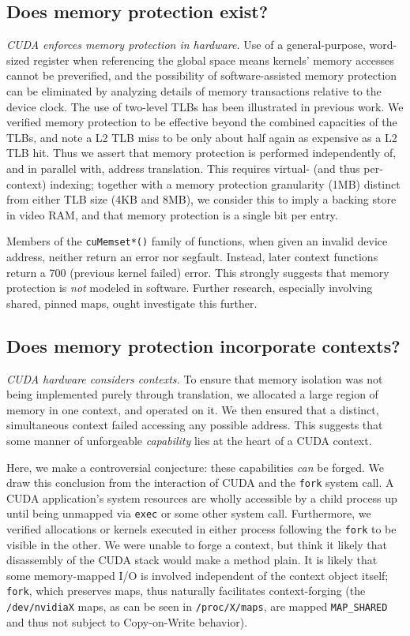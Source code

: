 \documentclass[letterpaper,10pt]{article}
\begin{document}
\begin{multicols}{2}
\subsection{Does memory protection exist?}
\textit{CUDA enforces memory protection in hardware.} Use of a general-purpose,
word-sized register when referencing the global space means kernels' memory
accesses cannot be preverified, and the possibility of software-assisted memory
protection can be eliminated by analyzing details of memory transactions
relative to the device clock\cite{microbenchmarks}. The use of two-level TLBs
has been illustrated in previous work\cite{demmel}. We verified memory
protection to be effective beyond the combined capacities of the TLBs, and
note a L2 TLB miss to be only about half again as expensive as a L2 TLB hit.
Thus we assert that memory protection is performed independently of, and in
parallel with, address translation. This requires virtual- (and thus per-context)
indexing; together with a memory protection granularity (1MB) distinct from
either TLB size (4KB and 8MB), we consider this to imply a backing store in
video RAM, and that memory protection is a single bit per entry.

Members of the \texttt{cuMemset*()} family of functions, when given an invalid device address,
neither return an error nor segfault. Instead, later context functions return
a 700 (previous kernel failed) error. This strongly suggests that memory
protection is \textit{not} modeled in software. Further research, especially
involving shared, pinned maps, ought investigate this further.
\subsection{Does memory protection incorporate contexts?}
\textit{CUDA hardware considers contexts.} To ensure that memory isolation
was not being implemented purely through translation, we allocated a large
region of memory in one context, and operated on it. We then ensured that a
distinct, simultaneous context failed accessing any possible address. This
suggests that some manner of unforgeable \textit{capability}\cite{capability}
lies at the heart of a CUDA context.

Here, we make a controversial conjecture: these capabilities \textit{can}
be forged. We draw this conclusion from the interaction of CUDA and the \texttt{fork}
system call. A CUDA application's system resources are wholly accessible by a
child process up until being unmapped via \texttt{exec} or some other system call.
Furthermore, we verified allocations or kernels executed in either process following the
\texttt{fork} to be visible in the other. We were unable to forge a context,
but think it likely that disassembly of the CUDA stack would make a method plain.
It is likely that some memory-mapped I/O is involved independent of the context
object itself; \texttt{fork}, which preserves maps, thus naturally facilitates
context-forging (the \texttt{/dev/nvidiaX} maps, as can be seen in \texttt{/proc/X/maps},
are mapped \texttt{MAP\_SHARED} and thus not subject to Copy-on-Write behavior).

\end{multicols}
\end{document}

